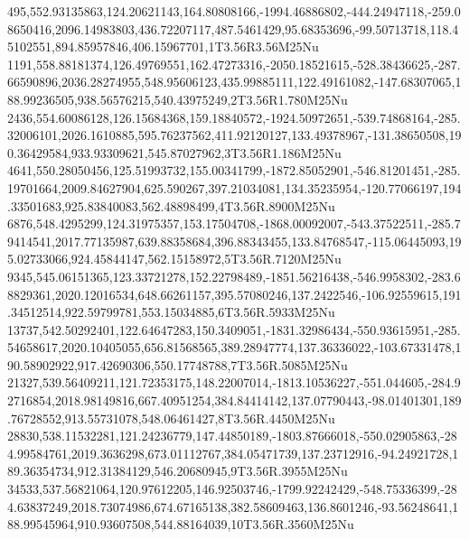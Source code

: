 495,552.93135863,124.20621143,164.80808166,-1994.46886802,-444.24947118,-259.08650416,2096.14983803,436.72207117,487.5461429,95.68353696,-99.50713718,118.45102551,894.85957846,406.15967701,1T3.56R3.56M25Nu
1191,558.88181374,126.49769551,162.47273316,-2050.18521615,-528.38436625,-287.66590896,2036.28274955,548.95606123,435.99885111,122.49161082,-147.68307065,188.99236505,938.56576215,540.43975249,2T3.56R1.780M25Nu
2436,554.60086128,126.15684368,159.18840572,-1924.50972651,-539.74868164,-285.32006101,2026.1610885,595.76237562,411.92120127,133.49378967,-131.38650508,190.36429584,933.93309621,545.87027962,3T3.56R1.186M25Nu
4641,550.28050456,125.51993732,155.00341799,-1872.85052901,-546.81201451,-285.19701664,2009.84627904,625.590267,397.21034081,134.35235954,-120.77066197,194.33501683,925.83840083,562.48898499,4T3.56R.8900M25Nu
6876,548.4295299,124.31975357,153.17504708,-1868.00092007,-543.37522511,-285.79414541,2017.77135987,639.88358684,396.88343455,133.84768547,-115.06445093,195.02733066,924.45844147,562.15158972,5T3.56R.7120M25Nu
9345,545.06151365,123.33721278,152.22798489,-1851.56216438,-546.9958302,-283.68829361,2020.12016534,648.66261157,395.57080246,137.2422546,-106.92559615,191.34512514,922.59799781,553.15034885,6T3.56R.5933M25Nu
13737,542.50292401,122.64647283,150.3409051,-1831.32986434,-550.93615951,-285.54658617,2020.10405055,656.81568565,389.28947774,137.36336022,-103.67331478,190.58902922,917.42690306,550.17748788,7T3.56R.5085M25Nu
21327,539.56409211,121.72353175,148.22007014,-1813.10536227,-551.044605,-284.92716854,2018.98149816,667.40951254,384.84414142,137.07790443,-98.01401301,189.76728552,913.55731078,548.06461427,8T3.56R.4450M25Nu
28830,538.11532281,121.24236779,147.44850189,-1803.87666018,-550.02905863,-284.99584761,2019.3636298,673.01112767,384.05471739,137.23712916,-94.24921728,189.36354734,912.31384129,546.20680945,9T3.56R.3955M25Nu
34533,537.56821064,120.97612205,146.92503746,-1799.92242429,-548.75336399,-284.63837249,2018.73074986,674.67165138,382.58609463,136.8601246,-93.56248641,188.99545964,910.93607508,544.88164039,10T3.56R.3560M25Nu
